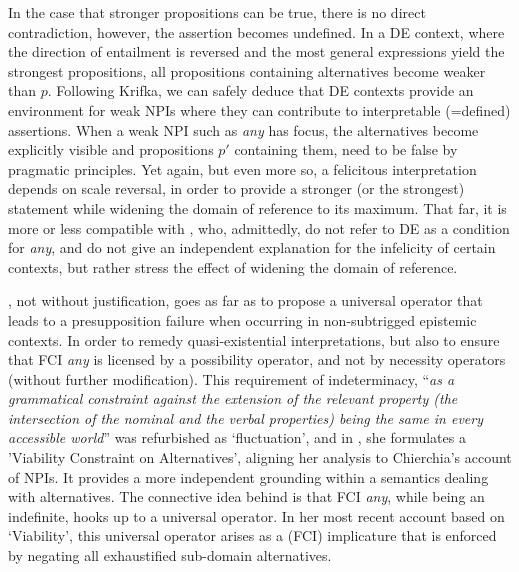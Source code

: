 \documentclass[output=paper,colorlinks,citecolor=brown,
]{langscibook}
\begin{document}
In the case that stronger propositions can be true, there is no direct contradiction, however, the assertion becomes
undefined. In a DE context, where the direction of entailment is reversed and the most general expressions yield the
strongest propositions, all propositions containing alternatives become weaker than $p$. Following Krifka, we can
safely deduce that DE contexts provide an environment for weak NPIs where they can contribute to interpretable
(=defined) assertions. When a weak NPI such as \textit{any} has focus, the alternatives become explicitly visible and
propositions $p'$ containing them, need to be false by pragmatic principles. Yet again, but even more so, a felicitous
interpretation depends on scale reversal, in order to provide a stronger (or the strongest) statement while widening
the domain of reference to its maximum. That far, it is more or less compatible with \citet{kadmonlandmann1993}, who,
admittedly, do not refer to DE as a condition for \textit{any}, and do not give an independent explanation for the
infelicity of certain contexts, but rather stress the effect of widening the domain of reference.

\citet{dayal1998}, not without justification, goes as far as to propose a universal operator that leads to a
presupposition failure when occurring in non-subtrigged epistemic contexts. In order to remedy quasi-existential
interpretations, but also to ensure that FCI {\em any} is licensed by a possibility operator, and not by necessity
operators (without further modification). This requirement of indeterminacy, ``{\em as a grammatical constraint against
the extension of the relevant property (the intersection of the nominal and the verbal properties) being the same in
every accessible world}'' \citep[237]{dayal2009} was refurbished as `fluctuation', and  in \citet{dayal2013}, she
formulates a 'Viability Constraint on Alternatives', aligning her analysis to Chierchia's \citeyearpar{chierchia2011}
account of NPIs. It provides a more independent grounding within a semantics dealing with alternatives. The connective
idea behind is that FCI {\em any}, while being an indefinite, hooks up to a universal operator. In her most recent
account based on `Viability', this universal operator arises as a (FCI) implicature that is enforced by negating all
exhaustified sub-domain alternatives.
\end{document}
